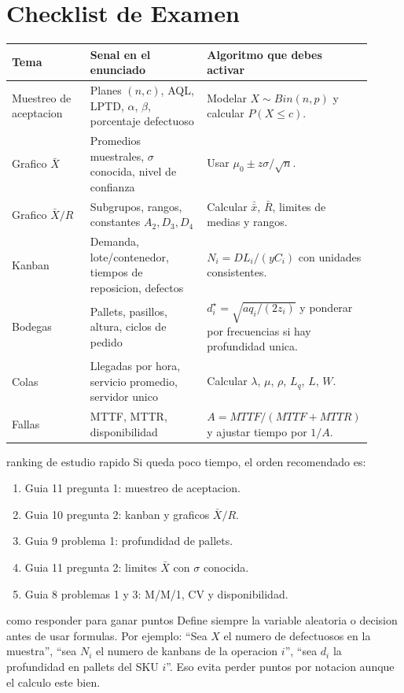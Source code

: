 \section{Checklist de Examen}

\begin{longtable}{p{0.24\linewidth}p{0.36\linewidth}p{0.31\linewidth}}
\toprule
Tema & Senal en el enunciado & Algoritmo que debes activar \\
\midrule
\endhead
Muestreo de aceptacion & Planes $(n,c)$, AQL, LPTD, $\alpha$, $\beta$, porcentaje defectuoso & Modelar $X\sim Bin(n,p)$ y calcular $P(X\le c)$. \\
Grafico $\bar X$ & Promedios muestrales, $\sigma$ conocida, nivel de confianza & Usar $\mu_0\pm z\sigma/\sqrt n$. \\
Grafico $\bar X/R$ & Subgrupos, rangos, constantes $A_2,D_3,D_4$ & Calcular $\bar{\bar x}$, $\bar R$, limites de medias y rangos. \\
Kanban & Demanda, lote/contenedor, tiempos de reposicion, defectos & $N_i=D L_i/(y C_i)$ con unidades consistentes. \\
Bodegas & Pallets, pasillos, altura, ciclos de pedido & $d_i^\star=\sqrt{a q_i/(2z_i)}$ y ponderar por frecuencias si hay profundidad unica. \\
Colas & Llegadas por hora, servicio promedio, servidor unico & Calcular $\lambda$, $\mu$, $\rho$, $L_q$, $L$, $W$. \\
Fallas & MTTF, MTTR, disponibilidad & $A=MTTF/(MTTF+MTTR)$ y ajustar tiempo por $1/A$. \\
\bottomrule
\end{longtable}

\begin{materia}{ranking de estudio rapido}
Si queda poco tiempo, el orden recomendado es:
\begin{enumerate}
  \item Guia 11 pregunta 1: muestreo de aceptacion.
  \item Guia 10 pregunta 2: kanban y graficos $\bar X/R$.
  \item Guia 9 problema 1: profundidad de pallets.
  \item Guia 11 pregunta 2: limites $\bar X$ con $\sigma$ conocida.
  \item Guia 8 problemas 1 y 3: M/M/1, CV y disponibilidad.
\end{enumerate}
\end{materia}

\begin{alerta}{como responder para ganar puntos}
Define siempre la variable aleatoria o decision antes de usar formulas. Por ejemplo: ``Sea $X$ el numero de defectuosos en la muestra'', ``sea $N_i$ el numero de kanbans de la operacion $i$'', ``sea $d_i$ la profundidad en pallets del SKU $i$''. Eso evita perder puntos por notacion aunque el calculo este bien.
\end{alerta}
